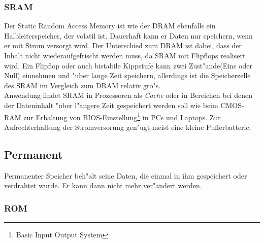 				\subsubsection{SRAM}
				\label{ch:Technisch:sec:Elektronische Speicherung:sub:Fl"uchtig:subsub:SRAM}
				
					Der \glqq Static Random Access Memory\grqq{} ist wie der DRAM ebenfalls ein Halbleiterspeicher, der volatil ist. Dauerhaft kann er Daten nur speichern, wenn er mit Strom versorgt wird. Der Unterschied zum DRAM ist dabei, dass der Inhalt nicht wiederaufgefrischt werden muss, da SRAM mit Flipflops realisert wird. Ein Flipflop oder auch bistabile Kippstufe kann zwei Zust"ande(Eins oder Null) einnehmen und "uber lange Zeit speichern, allerdings ist die Speicherzelle des SRAM im Vergleich zum DRAM relativ gro"s.
					\\
					Anwendung findet SRAM in Prozessoren als \textit{Cache} oder in Bereichen bei denen der Dateninhalt "uber l"angere Zeit gespeichert werden soll wie beim CMOS-RAM zur Erhaltung von BIOS-Einstellung\footnote[5]{Basic Input Output System} in PCs und Laptops. Zur Aufrechterhaltung der Stromversorung gen"ugt meist eine kleine Pufferbatterie.
					
        
        \subsection{Permanent}
        \label{ch:Technisch:sec:Elektronische Speicherung:sub:Permanent}
        
            Permanenter Speicher beh"alt seine Daten, die einmal in ihm gespeichert oder verdrahtet wurde. Er kann dann nicht mehr ver"andert werden.
			
				\subsubsection{ROM}
				\label{ch:Technisch:sec:Elektronische Speicherung:sub:Fl"uchtig:subsub:ROM}
				
